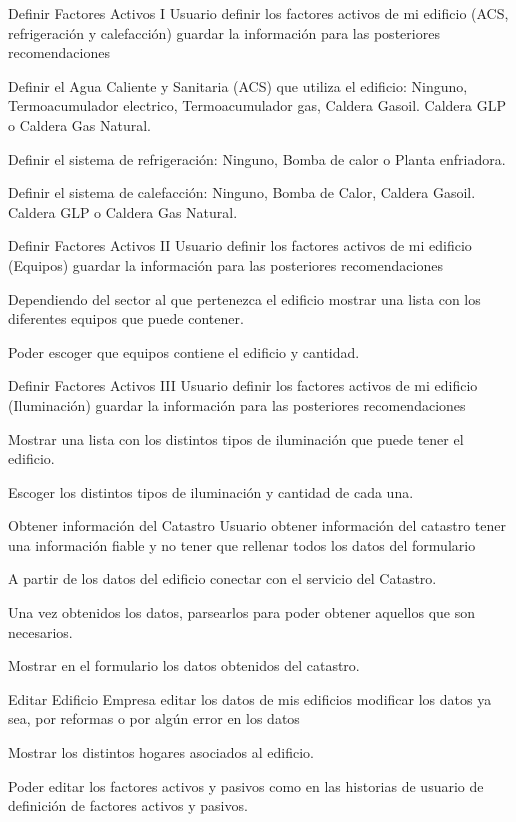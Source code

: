 \historiaDeUsuario
{Definir Factores Activos I}
{Usuario}
{definir los factores activos de mi edificio (ACS, refrigeración y calefacción)}
{guardar la información para las posteriores recomendaciones}
{
    \item Definir el Agua Caliente y Sanitaria (ACS) que utiliza el edificio: Ninguno, Termoacumulador electrico, Termoacumulador gas, Caldera Gasoil. Caldera GLP o Caldera Gas Natural.
    \item Definir el sistema de refrigeración: Ninguno, Bomba de calor o Planta enfriadora.
    \item Definir el sistema de calefacción: Ninguno, Bomba de Calor, Caldera Gasoil. Caldera GLP o Caldera Gas Natural.
}

\historiaDeUsuario
{Definir Factores Activos II}
{Usuario}
{definir los factores activos de mi edificio (Equipos)}
{guardar la información para las posteriores recomendaciones}
{
    \item Dependiendo del sector al que pertenezca el edificio mostrar una lista con los diferentes equipos que puede contener.
    \item Poder escoger que equipos contiene el edificio y cantidad.
}

\historiaDeUsuario
{Definir Factores Activos III}
{Usuario}
{definir los factores activos de mi edificio (Iluminación)}
{guardar la información para las posteriores recomendaciones}
{
    \item Mostrar una lista con los distintos tipos de iluminación que puede tener el edificio.
    \item Escoger los distintos tipos de iluminación y cantidad de cada una.
}

\historiaDeUsuario
{Obtener información del Catastro}
{Usuario}
{obtener información del catastro}
{tener una información fiable y no tener que rellenar todos los datos del formulario}
{
    \item A partir de los datos del edificio conectar con el servicio del Catastro.
    \item Una vez obtenidos los datos, parsearlos para poder obtener aquellos que son necesarios.
    \item Mostrar en el formulario los datos obtenidos del catastro.
}

\historiaDeUsuario
{Editar Edificio}
{Empresa}
{editar los datos de mis edificios}
{modificar los datos ya sea, por reformas o por algún error en los datos}
{
    \item Mostrar los distintos hogares asociados al edificio.
    \item Poder editar los factores activos y pasivos como en las historias de usuario de definición de factores activos y pasivos. 
}


